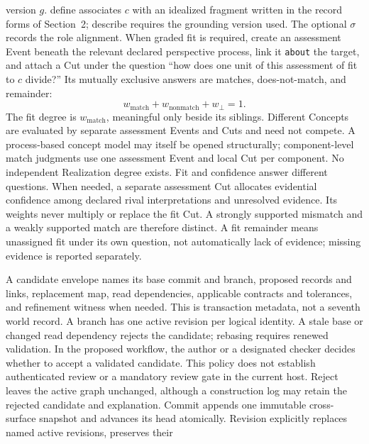 \documentclass[11pt,a4paper]{article}
\begin{document}
\begin{description}
    version $g$. \textsf{define} associates $c$ with an idealized fragment
    written in the record forms of Section~2; \textsf{describe} requires the
    grounding version used. The optional $\sigma$ records the role alignment.
    When graded fit is required, create an assessment Event beneath the
    relevant declared perspective process, link it \texttt{about} the target, and
    attach a Cut under the question
    ``how does one unit of this assessment of fit to $c$ divide?'' Its
    mutually exclusive answers are \textsf{matches}, \textsf{does-not-match},
    and remainder:
    \begin{equation}
      w_{\mathrm{match}}+w_{\mathrm{nonmatch}}+w_\bot=1.
    \end{equation}
    The fit degree is $w_{\mathrm{match}}$, meaningful only beside its
    siblings. Different Concepts are evaluated by separate assessment Events
    and Cuts and need not compete.
    A process-based concept model may itself be opened structurally; component-level
    match judgments use one assessment Event and local Cut per component. No
    independent Realization degree exists. Fit and confidence answer different
    questions. When needed, a separate assessment Cut allocates evidential
    confidence among declared rival interpretations and unresolved evidence.
    Its weights never multiply or replace the fit Cut. A strongly supported
    mismatch and a weakly supported match are therefore distinct. A fit
    remainder means unassigned fit under its own question, not automatically
    lack of evidence; missing evidence is reported separately.
  \item[A11 Profile---Decide.] A candidate envelope names its base commit and
    branch, proposed records and links, replacement map, read dependencies,
    applicable contracts and tolerances, and refinement witness when needed.
    This is transaction metadata, not a seventh world record. A branch has
    one active revision per logical identity. A stale base or changed read
    dependency rejects the candidate; rebasing requires renewed validation.
    In the proposed workflow, the author or a designated checker decides whether
    to accept a validated candidate. This policy does not establish authenticated
    review or a mandatory review gate in the current host.
    Reject leaves the active graph unchanged, although a construction log
    may retain the rejected candidate and explanation. Commit appends one
    immutable cross-surface snapshot and advances its head atomically.
    Revision explicitly replaces named active revisions, preserves their

\end{description}
\end{document}
